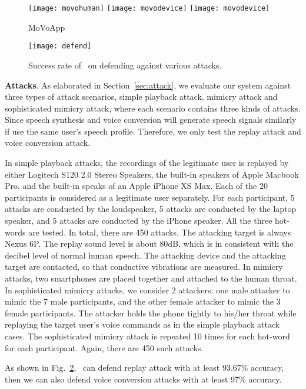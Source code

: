\begin{figure}[h]
	\centering
	\texttt{[image: movohuman]}
	\texttt{[image: movodevice]}
	\texttt{[image: movodevice]}
	\caption{MoVoApp}
	\label{fig:defendapp}
\end{figure}

\begin{figure}[h]
	\centering
	\texttt{[image: defend]}
	\caption{Success rate of \shortname~on defending against various attacks. }
	\label{fig:defend}
\end{figure}

\textbf{Attacks}. As elaborated in Section~\ref{sec:attack}, we evaluate our system against three types of attack scenarios, simple playback attack, mimicry attack and sophisticated mimicry attack, where each scenario contains three kinds of attacks.  Since speech synthesis and voice conversion will generate speech signals similarly if use the same user's speech profile. Therefore, we only test the replay attack and voice conversion attack.

In simple playback attacks, the recordings of the legitimate user is replayed by either Logitech S120 2.0 Stereo Speakers, the built-in speakers of Apple Macbook Pro, and the built-in speaks of an Apple iPhone XS Max. Each of the 20 participants is considered as a legitimate user separately. For each participant, 5 attacks are conducted by the loudspeaker, 5 attacks are conducted by the laptop speaker, and 5 attacks are conducted by the iPhone speaker. All the three hot-words are tested. In total, there are 450 attacks. The attacking target is always Nexus 6P. The replay sound level is about 80dB, which is in consistent with the decibel level of normal human speech. 
The attacking device and the attacking target  are contacted, so that conductive vibrations are measured. In mimicry attacks, two smartphones are placed together and attached to the human throat. In sophisticated mimicry attacks, we consider 2 attackers: one male attacker to mimic the 7 male participants, and the other female attacker to mimic the 3 female participants. The attacker holds the phone tightly to his/her throat while replaying the target user's voice commands as in the simple playback attack cases. The sophisticated mimicry attack is repeated 10 times for each hot-word for each participant. Again, there are 450 such attacks.

As shown in Fig.~\ref{fig:defend}, \shortname~can defend replay attack with at least 93.67\% accuracy, then we can also defend  voice conversion attacks with at least 97\% accuracy.











